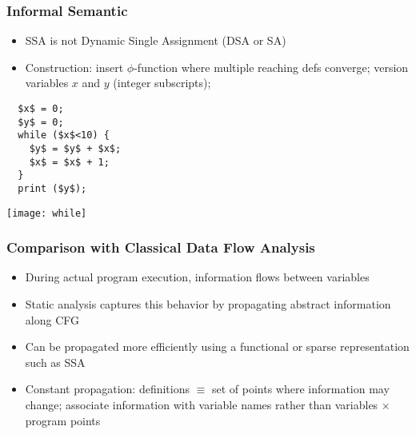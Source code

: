 \begin{frame}[fragile]
\frametitle{Informal Semantic}
\begin{minipage}[b]{\textwidth}
\begin{itemize}
\item SSA is not Dynamic Single Assignment (DSA or SA)
\item Construction: insert $\phi$-function where multiple reaching defs converge; version variables $x$ and $y$ (integer subscripts); 
\end{itemize}
\end{minipage}

\strut\hfill
\begin{minipage}[t]{0.3\textwidth}
  \begin{lstlisting}
  $x$ = 0;
  $y$ = 0;
  while ($x$<10) {
    $y$ = $y$ + $x$;
    $x$ = $x$ + 1;
  }
  print ($y$);
  \end{lstlisting}
\end{minipage}
\hfill
\begin{minipage}[t]{0.3\textwidth}
\strut
\texttt{[image: while]}
\end{minipage}
\hfill\strut
\end{frame}

\begin{frame}
\frametitle{Comparison with Classical Data Flow Analysis}
\begin{itemize}
\item During actual program execution, information flows between variables
\item Static analysis captures this behavior by propagating abstract information along CFG
\item Can be propagated more efficiently using a functional or sparse representation such as SSA
\item Constant propagation: definitions $\equiv$ set of points where information may change; associate information with variable names rather than variables $\times$ program points
\end{itemize}
\end{frame}

